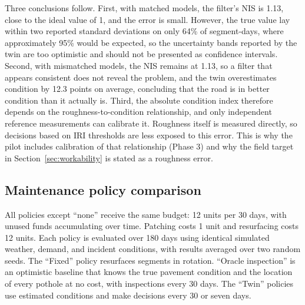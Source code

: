 \documentclass[11pt,a4paper]{article}
\renewcommand{\arraystretch}{1.35}
\begin{document}
Three conclusions follow. First, with matched models, the filter's NIS is 1.13, close to the ideal value of 1, and the error is small. However, the true value lay within two reported standard deviations on only 64\% of segment-days, where approximately 95\% would be expected, so the uncertainty bands reported by the twin are too optimistic and should not be presented as confidence intervals. Second, with mismatched models, the NIS remains at 1.13, so a filter that appears consistent does not reveal the problem, and the twin overestimates condition by 12.3 points on average, concluding that the road is in better condition than it actually is. Third, the absolute condition index therefore depends on the roughness-to-condition relationship, and only independent reference measurements can calibrate it. Roughness itself is measured directly, so decisions based on IRI thresholds are less exposed to this error. This is why the pilot includes calibration of that relationship (Phase 3) and why the field target in Section~\ref{sec:workability} is stated as a roughness error.

\subsection{Maintenance policy comparison}
All policies except ``none'' receive the same budget: 12 units per 30 days, with unused funds accumulating over time. Patching costs 1 unit and resurfacing costs 12 units. Each policy is evaluated over 180 days using identical simulated weather, demand, and incident conditions, with results averaged over two random seeds. The ``Fixed'' policy resurfaces segments in rotation. ``Oracle inspection'' is an optimistic baseline that knows the true pavement condition and the location of every pothole at no cost, with inspections every 30 days. The ``Twin'' policies use estimated conditions and make decisions every 30 or seven days.

\begin{table}[h]
\centering\small
\renewcommand{\arraystretch}{1.4}

\caption{Simulated maintenance-policy comparison (matched models). Lower values are better, except for mean CI, where higher is better. Only two random seeds were used, so variability across seeds has not been characterised. Results depend on illustrative parameters, including the assumed cost ratio of 1 to 12 and the assumption that resurfacing restores damage to 0.05.}
\end{table}
\end{document}
